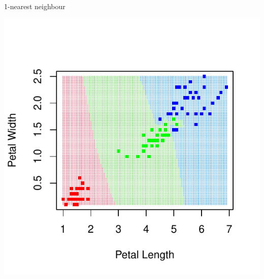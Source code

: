 \documentclass[aspectratio=1610, t]{beamer}\usepackage[]{graphicx}\usepackage[]{color}
\makeatletter
\def\maxwidth{ %
  \ifdim\Gin@nat@width>\linewidth
    \linewidth
  \else
    \Gin@nat@width
  \fi
}
\newenvironment{knitrout}{}{} %
\makeatother
\begin{document}
\begin{frame}{1-nearest neighbour}
\vspace{-2cm}
\begin{knitrout}
\color{fgcolor}

{\centering \includegraphics[width=\maxwidth]{figure/knn1-1} 

}


\end{knitrout}
\end{frame}


\end{document}
